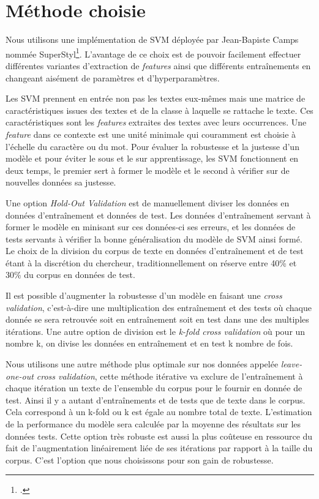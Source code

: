 \section{Méthode choisie}

Nous utilisons une implémentation de SVM déployée par Jean-Bapiste Camps nommée SuperStyl\footcites{camps_supervised_2021}. L'avantage de ce choix est de pouvoir facilement effectuer différentes variantes d'extraction de \textit{features} ainsi que différents entraînements en changeant aisément de paramètres et d'hyperparamètres.

Les SVM prennent en entrée non pas les textes eux-mêmes mais une matrice de caractéristiques issues des textes et de la classe à laquelle se rattache le texte. Ces caractéristiques sont les \textit{features} extraites des textes avec leurs occurrences. Une \textit{feature} dans ce contexte est une unité minimale qui couramment est choisie à l'échelle du caractère ou du mot. Pour évaluer la robustesse et la justesse d'un modèle et pour éviter le sous et le sur apprentissage, les SVM fonctionnent en deux temps, le premier sert à former le modèle et le second à vérifier sur de nouvelles données sa justesse.

Une option \textit{Hold-Out Validation} est de manuellement diviser les données en données d'entraînement et données de test. Les données d'entraînement servant à former le modèle en minisant sur ces données-ci ses erreurs, et les données de tests servants à vérifier la bonne généralisation du modèle de SVM ainsi formé. Le choix de la division du corpus de texte en données d'entraînement et de test étant à la discrétion du chercheur, traditionnellement on réserve entre 40\% et 30\% du corpus en données de test.

Il est possible d'augmenter la robustesse d'un modèle en faisant une \textit{cross validation}, c'est-à-dire une multiplication des entraînement et des tests où chaque donnée se sera retrouvée soit en entraînement soit en test dans une des multiples itérations.
Une autre option de division est le \textit{k-fold cross validation} où pour un nombre k, on divise les données en entraînement et en test k nombre de fois. 

Nous utilisons une autre méthode plus optimale sur nos données appelée \textit{leave-one-out cross validation}, cette méthode itérative va exclure de l'entraînement à chaque itération un texte de l'ensemble du corpus pour le fournir en donnée de test. Ainsi il y a autant d'entraînements et de tests que de texte dans le corpus. Cela correspond à un k-fold ou k est égale au nombre total de texte. L'estimation de la performance du modèle sera calculée par la moyenne des résultats sur les données tests. Cette option très robuste est aussi la plus coûteuse en ressource du fait de l'augmentation linéairement liée de ses itérations par rapport à la taille du corpus. C'est l'option que nous choisissons pour son gain de robustesse.

